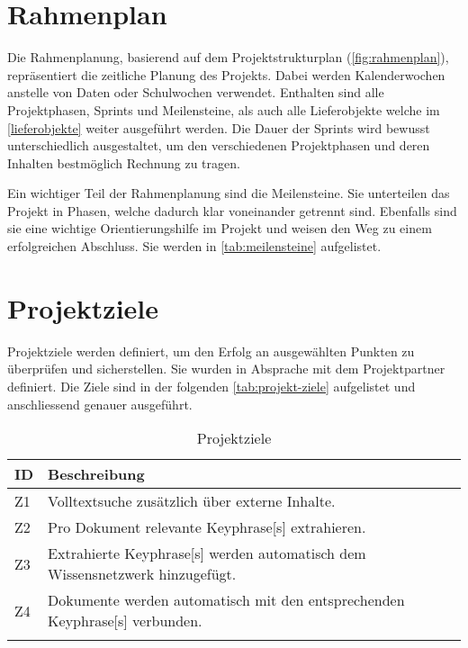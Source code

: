 \section{Rahmenplan}
Die Rahmenplanung, basierend auf dem Projektstrukturplan (\autoref{fig:rahmenplan}), repräsentiert die zeitliche Planung des Projekts. Dabei werden Kalenderwochen anstelle von Daten oder Schulwochen verwendet. Enthalten sind alle Projektphasen, Sprints und Meilensteine, als auch alle Lieferobjekte welche im \autoref{lieferobjekte} weiter ausgeführt werden. Die Dauer der Sprints wird bewusst unterschiedlich ausgestaltet, um den verschiedenen Projektphasen und deren Inhalten bestmöglich Rechnung zu tragen.

Ein wichtiger Teil der Rahmenplanung sind die Meilensteine. Sie unterteilen das Projekt in Phasen, welche dadurch klar voneinander getrennt sind. Ebenfalls sind sie eine wichtige Orientierungshilfe im Projekt und weisen den Weg zu einem erfolgreichen Abschluss. Sie werden in \autoref{tab:meilensteine} aufgelistet.

\newpage
\section{Projektziele} \label{projektziele}
Projektziele werden definiert, um den Erfolg an ausgewählten Punkten zu überprüfen und sicherstellen. Sie wurden in Absprache mit dem Projektpartner definiert. Die Ziele sind in der folgenden \autoref{tab:projekt-ziele} aufgelistet und anschliessend genauer ausgeführt.



\begin{longtable}{|p{1cm}  | p{10.5cm}|}
  \hline
    ID & Beschreibung \\\hline
    Z1 & Volltextsuche zusätzlich über externe Inhalte.\\\hline
    Z2 & Pro Dokument relevante \gls{Keyphrase}[s] extrahieren.\\\hline
    Z3 & Extrahierte \gls{Keyphrase}[s] werden automatisch dem Wissensnetzwerk hinzugefügt.\\\hline
    Z4 & Dokumente werden automatisch mit den entsprechenden \gls{Keyphrase}[s] verbunden.\\\hline
    \caption{Projektziele}
  \label{tab:projekt-ziele}
\end{longtable}


